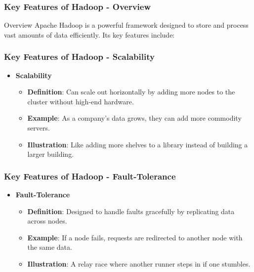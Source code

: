 \documentclass[aspectratio=169]{beamer}
\begin{document}
\begin{frame}
    \frametitle{Key Features of Hadoop - Overview}
    \begin{block}{Overview}
        Apache Hadoop is a powerful framework designed to store and process vast amounts of data efficiently. Its key features include:
    \end{block}
\end{frame}

\begin{frame}
    \frametitle{Key Features of Hadoop - Scalability}
    \begin{itemize}
        \item \textbf{Scalability}
        \begin{itemize}
            \item \textbf{Definition}: Can scale out horizontally by adding more nodes to the cluster without high-end hardware.
            \item \textbf{Example}: As a company’s data grows, they can add more commodity servers.
            \item \textbf{Illustration}: Like adding more shelves to a library instead of building a larger building.
        \end{itemize}
    \end{itemize}
\end{frame}

\begin{frame}
    \frametitle{Key Features of Hadoop - Fault-Tolerance}
    \begin{itemize}
        \item \textbf{Fault-Tolerance}
        \begin{itemize}
            \item \textbf{Definition}: Designed to handle faults gracefully by replicating data across nodes.
            \item \textbf{Example}: If a node fails, requests are redirected to another node with the same data.
            \item \textbf{Illustration}: A relay race where another runner steps in if one stumbles.
        \end{itemize}
    \end{itemize}
\end{frame}
\end{document}
